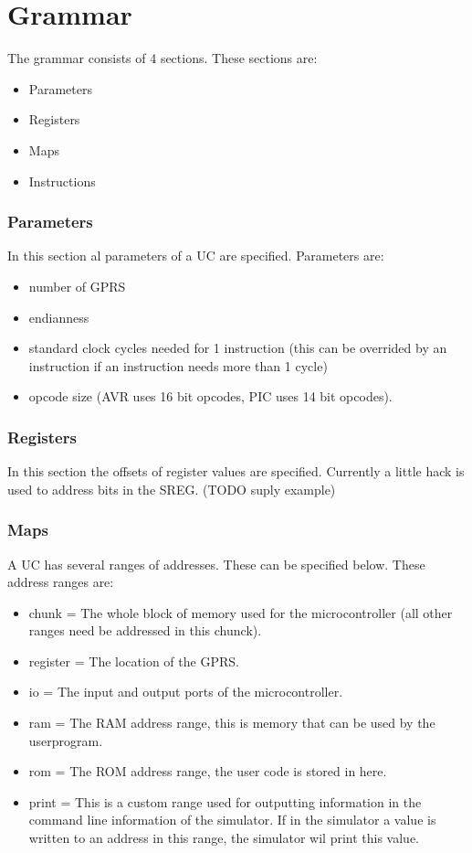 \chapter{Grammar}

The grammar consists of 4 sections. These sections are:
\begin{itemize}
\item Parameters
\item Registers
\item Maps
\item Instructions
\end{itemize}

\subsection{Parameters}
In this section al parameters of a \ac{UC} are specified. Parameters are: 

\begin{itemize}
\item number of \ac{GPRS} 
\item endianness
\item standard clock cycles needed for 1 instruction (this can be overrided by an instruction if an instruction needs more than 1 cycle)
\item opcode size (AVR uses 16 bit opcodes, PIC uses 14 bit opcodes).
\end{itemize} 

\subsection{Registers}
In this section the offsets of register values are specified. Currently a little hack is used to address bits in the \ac{SREG}. (TODO suply example)

\subsection{Maps}
A \ac{UC} has several ranges of addresses. These can be specified below. These address ranges are:
\begin{itemize}
\item chunk = The whole block of memory used for the microcontroller (all other ranges need be addressed in this chunck).
\item register = The location of the \ac{GPRS}.
\item io = The input and output ports of the microcontroller.
\item ram = The \ac{RAM} address range, this is memory that can be used by the userprogram.
\item rom = The \ac{ROM} address range, the user code is stored in here. 
\item print = This is a custom range used for outputting information in the command line information of the simulator. If in the simulator a value is written to an address in this range, the simulator wil print this value.
\end{itemize}

